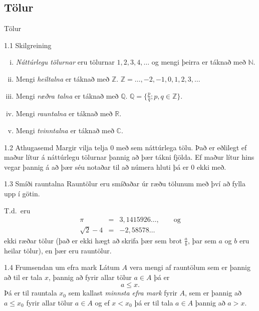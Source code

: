 \documentclass[icelandic,a4paper,12pt]{article}
\newcommand{\C}{{\mathbb  C}}
\newcommand{\Z}{{\mathbb Z}}
\newcommand{\R}{{\mathbb  R}}
\newcommand{\N}{{\mathbb  N}}
\newcommand{\Q}{{\mathbb Q}}
\begin{document}
\subsection*{Tölur}

\begin{frame}{Tölur}
\begin{block}{1.1 Skilgreining}
\begin{enumerate}[(i)]
\item  \emph{Náttúrlegu tölurnar} eru tölurnar
$1, 2, 3, 4, \ldots$ og mengi þeirra er táknað með $\N$.   \pause
\item Mengi \emph{heiltalna} er táknað með $\Z$. $\Z = \ldots,-2,-1,0,1,2,3,\ldots$\pause
\item Mengi \emph{ræðra talna} er táknað með $\Q$. $\Q = \{ \frac pq ; p,q \in \Z \}$.\pause
\item Mengi \emph{rauntalna} er táknað með $\R$.\pause
\item Mengi \emph{tvinntalna} er táknað með $\C$.
\end{enumerate}
\end{block}

\pause

\begin{block}{1.2 Athugasemd}  
Margir vilja telja $0$ með sem náttúrlega tölu.  Það er eðlilegt ef 
maður lítur á náttúrlegu tölurnar þannig að þær tákni fjölda.  Ef maður lítur hins vegar þannig
á að þær séu notaðar til að númera hluti
þá er 0 ekki með.
\end{block}

\end{frame}


\begin{frame}
\begin{block}{1.3 Smíði rauntalna}  Rauntölur eru smíðaðar úr ræðu tölunum
með því að fylla upp í götin. 

\pause

T.d.~eru 
\begin{eqnarray*}
\pi &=& 3,1415926\ldots, \qquad \text{og}\\
\sqrt 2 -4  &=& -2,58578\ldots
\end{eqnarray*}
ekki ræðar tölur (það er ekki hægt að skrifa þær sem brot $\frac ab$, 
þar sem $a$ og $b$ eru heilar tölur), en þær eru rauntölur.
\end{block}

\pause


\begin{block}{1.4 Frumsendan um efra mark}  
Látum $A$ vera mengi af  rauntölum
sem er þannig að til er tala $x$, þannig að 
fyrir allar tölur $a \in A$ þá er 
$$a\leq x.$$ 
Þá er til rauntala $x_0$ sem kallast {\em minnsta efra mark} fyrir
$A$, sem er þannig að  $a\leq x_0$ fyrir allar tölur $a\in
A$ og ef $x<x_0$ þá er til tala $a\in A$ þannig að $a>x$.  
\end{block}
\end{frame}
\end{document}
